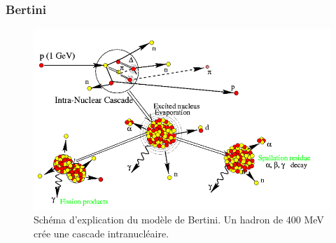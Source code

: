 \subsubsection{Bertini}
\begin{figure}[!ht]
  \begin{center}
    \includegraphics[width=.8\textwidth]{Digitizer/figs/intraNucl.png}
    \caption{Schéma d'explication du modèle de Bertini. Un hadron de 400 MeV crée une cascade intranucléaire.}
    \label{fig.g4bertini}
  \end{center}
\end{figure}
